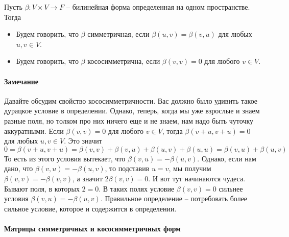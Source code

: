 \begin{definition}
Пусть $\beta\colon V\times V\to F$ -- билинейная форма определенная на одном пространстве. Тогда
\begin{itemize}
\item Будем говорить, что $\beta$ симметричная, если $\beta(u,v) = \beta(v,u)$ для любых $u,v\in V$.

\item Будем говорить, что $\beta$ кососимметрична, если $\beta(v,v) = 0$ для любого $v\in V$.
\end{itemize}
\end{definition}

\paragraph{Замечание}
Давайте обсудим свойство кососимметричности. Вас должно было удивить такое дурацкое условие в определении. Однако, теперь, когда мы уже взрослые и знаем разные поля, но толком про них ничего еще и не знаем, нам надо быть чуточку аккуратными. Если $\beta(v,v) = 0$ для любого $v\in V$, тогда $\beta(v+u,v+u) = 0$ для любых $u,v\in V$. Это значит
\[
0=\beta(v+u,v+u) = \beta(v,v) + \beta(v,u) + \beta(u,v)+\beta(u,u) = \beta(v,u) + \beta(u,v)
\]
То есть из этого условия вытекает, что $\beta(v,u) = -\beta(u,v)$. Однако, если нам дано, что $\beta(v,u) = -\beta(u,v)$, то подставив $u = v$, мы получим $\beta(v,v) = -\beta(v,v)$, а значит $2\beta(v,v) = 0$. И вот тут начинаются чудеса. Бывают поля, в которых $2 = 0$. В таких полях условие $\beta(v,v) = 0$ сильнее условия $\beta(v,u) = -\beta(u,v)$. Правильное определение -- потребовать более сильное условие, которое и содержится в определении.

\paragraph{Матрицы симметричных и кососимметричных форм}

